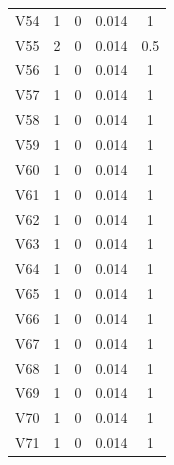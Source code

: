 \documentclass[a4paper, 12pt, openright, oneside, german, french, english, brazil]{abntex2}
\begin{document}
\begin{SingleSpace}
\begin{footnotesize}
\begin{center}
\begin{longtable}{c c c c c}
					V54 & 1 & 0 & 0.014 & 1 \\ 
					V55 & 2 & 0 & 0.014 & 0.5 \\ 
					V56 & 1 & 0 & 0.014 & 1 \\ 
					V57 & 1 & 0 & 0.014 & 1 \\ 
					V58 & 1 & 0 & 0.014 & 1 \\ 
					V59 & 1 & 0 & 0.014 & 1 \\ 
					V60 & 1 & 0 & 0.014 & 1 \\ 
					V61 & 1 & 0 & 0.014 & 1 \\ 
					V62 & 1 & 0 & 0.014 & 1 \\ 
					V63 & 1 & 0 & 0.014 & 1 \\ 
					V64 & 1 & 0 & 0.014 & 1 \\ 
					V65 & 1 & 0 & 0.014 & 1 \\ 
					V66 & 1 & 0 & 0.014 & 1 \\ 
					V67 & 1 & 0 & 0.014 & 1 \\ 
					V68 & 1 & 0 & 0.014 & 1 \\ 
					V69 & 1 & 0 & 0.014 & 1 \\ 
					V70 & 1 & 0 & 0.014 & 1 \\ 
					V71 & 1 & 0 & 0.014 & 1 \\ 
					
				\end{longtable}
			\end{center}
		\end{footnotesize}
	\end{SingleSpace}
	
\end{document}
